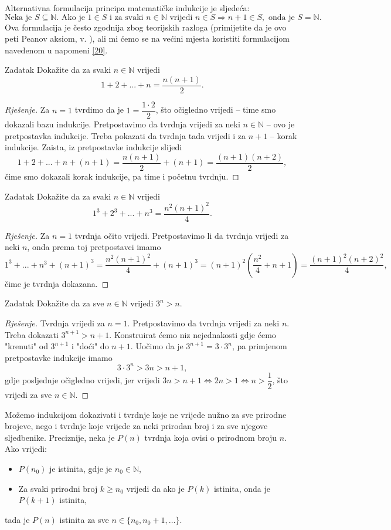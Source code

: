Alternativna formulacija principa matematičke indukcije je sljedeća:
\[\text{Neka je }S\subseteq \mathbb{N}. \text{ Ako je }1\in S\text{ i za svaki }n\in \mathbb{N}\text{ vrijedi } n\in S\Rightarrow n+1\in S,\text{ onda je }S=\mathbb{N}.\]
Ova formulacija je često zgodnija zbog teorijskih razloga (primijetite da je ovo peti Peanov aksiom, v. \cite{3}), ali mi ćemo se na većini mjesta koristiti formulacijom navedenom u napomeni \ref{20}.
\begin{exercise}{Zadatak}
Dokažite da za svaki \(n\in \mathbb{N}\) vrijedi
\[1+2+...+n=\dfrac{n(n+1)}{2}.\]
\end{exercise}
\begin{proof}[Rješenje]
Za \(n=1\) tvrdimo da je \(1=\dfrac{1\cdot 2}{2}\), što očigledno vrijedi -- time smo dokazali bazu indukcije. Pretpostavimo da tvrdnja vrijedi za neki \(n\in \mathbb{N}\) -- ovo je pretpostavka indukcije. Treba pokazati da tvrdnja tada vrijedi i za \(n+1\) -- korak indukcije. Zaista, iz pretpostavke indukcije slijedi
\[1+2+...+n+(n+1)=\dfrac{n(n+1)}{2}+(n+1)=\dfrac{(n+1)(n+2)}{2},\]
čime smo dokazali korak indukcije, pa time i početnu tvrdnju.
\end{proof}
\begin{exercise}{Zadatak}
Dokažite da za svaki \(n\in \mathbb{N}\) vrijedi
\[1^3+2^3+...+n^3=\dfrac{n^2(n+1)^2}{4}.\]
\end{exercise}
\begin{proof}[Rješenje]
Za \(n=1\) tvrdnja očito vrijedi. Pretpostavimo li da tvrdnja vrijedi za neki \(n\), onda prema toj pretpostavci imamo
\[1^3+...+n^3+(n+1)^3=\dfrac{n^2(n+1)^2}{4}+(n+1)^3=(n+1)^2\left(\dfrac{n^2}{4}+n+1\right)=\dfrac{(n+1)^2(n+2)^2}{4},\]
čime je tvrdnja dokazana.
\end{proof}
\begin{exercise}{Zadatak}
Dokažite da za sve \(n\in \mathbb{N}\) vrijedi \(3^n>n\).
\end{exercise}
\begin{proof}[Rješenje]
Tvrdnja vrijedi za \(n=1\). Pretpostavimo da tvrdnja vrijedi za neki \(n\). Treba dokazati \(3^{n+1}>n+1\). Konstruirat ćemo niz nejednakosti gdje ćemo "krenuti" od \(3^{n+1}\) i "doći" do \(n+1\). Uočimo da je \(3^{n+1}=3\cdot 3^n\), pa primjenom pretpostavke indukcije imamo \[3\cdot 3^n>3n>n+1,\]
gdje posljednje očigledno vrijedi, jer vrijedi \(3n>n+1\Leftrightarrow 2n>1\Leftrightarrow n>\dfrac{1}{2}\), što vrijedi za sve \(n\in \mathbb{N}\).
\end{proof}
\begin{remark}
\label{21}
Možemo indukcijom dokazivati i tvrdnje koje ne vrijede nužno za sve prirodne brojeve, nego i tvrdnje koje vrijede za neki prirodan broj i za sve njegove sljedbenike. Preciznije, neka je \(P(n)\) tvrdnja koja ovisi o prirodnom broju \(n\). Ako vrijedi:
\begin{itemize}
\item \(P(n_0)\) je istinita, gdje je \(n_0\in \mathbb{N}\),
\item Za svaki prirodni broj \(k\geq n_0\) vrijedi da ako je \(P(k)\) istinita, onda je \(P(k+1)\) istinita,
\end{itemize}
tada je \(P(n)\) istinita za sve \(n\in \{n_0, n_0+1,\dots\}\).
\end{remark}

